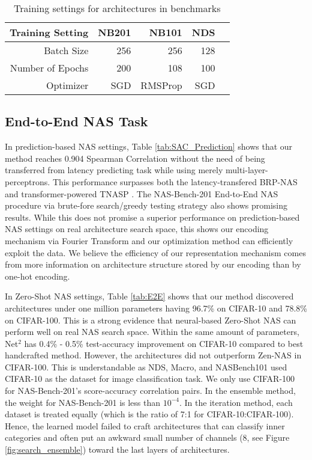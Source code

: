 \documentclass[lettersize,journal]{IEEEtran}
\begin{document}
        \begin{table}
                \caption{Training settings for architectures in benchmarks}
                \centering
                \begin{tabular}{r|rrrr}
                \toprule
                    Training Setting & NB201 & NB101 & NDS\\ 
                    \midrule
                        Batch Size & 256 & 256 & 128 \\ 
                        Number of Epochs & 200 & 108 & 100 \\ 
                        Optimizer & SGD & RMSProp & SGD 
                        \\ 
                    \bottomrule
                    \end{tabular}
                \label{tab:training_settings}
            \end{table}

    \subsection{End-to-End NAS Task}
        In prediction-based NAS settings, Table \ref{tab:SAC_Prediction} shows that our method reaches 0.904 Spearman Correlation without the need of being transferred from latency predicting task while using merely multi-layer-perceptrons. This performance surpasses both the latency-transfered BRP-NAS \cite{BRP-NAS} and transformer-powered TNASP \cite{TNASP}. The NAS-Bench-201 End-to-End NAS procedure via brute-fore search/greedy testing strategy also shows promising results. While this does not promise a superior performance on prediction-based NAS settings on real architecture search space, this shows our encoding mechanism via Fourier Transform and our optimization method can efficiently exploit the data. We believe the efficiency of our representation mechanism comes from more information on architecture structure stored by our encoding than by one-hot encoding.

        In Zero-Shot NAS settings, Table \ref{tab:E2E} shows that our method discovered architectures under one million parameters having 96.7\% on CIFAR-10 and 78.8\% on CIFAR-100. This is a strong evidence that neural-based Zero-Shot NAS can perform well on real NAS search space. Within the same amount of parameters, Net$^2$ has 0.4\% - 0.5\% test-accuracy improvement on CIFAR-10 compared to best handcrafted method. However, the architectures did not outperform Zen-NAS in CIFAR-100. This is understandable as NDS, Macro, and NASBench101 used CIFAR-10 as the dataset for image classification task. We only use CIFAR-100 for NAS-Bench-201's score-accuracy correlation pairs. In the ensemble method, the weight for NAS-Bench-201 is less than $10^{-4}$. In the iteration method, each dataset is treated equally (which is the ratio of 7:1 for CIFAR-10:CIFAR-100). Hence, the learned model failed to craft architectures that can classify inner categories and often put an awkward small number of channels (8, see Figure \ref{fig:search_ensemble}) toward the last layers of architectures.
        
\end{document}
